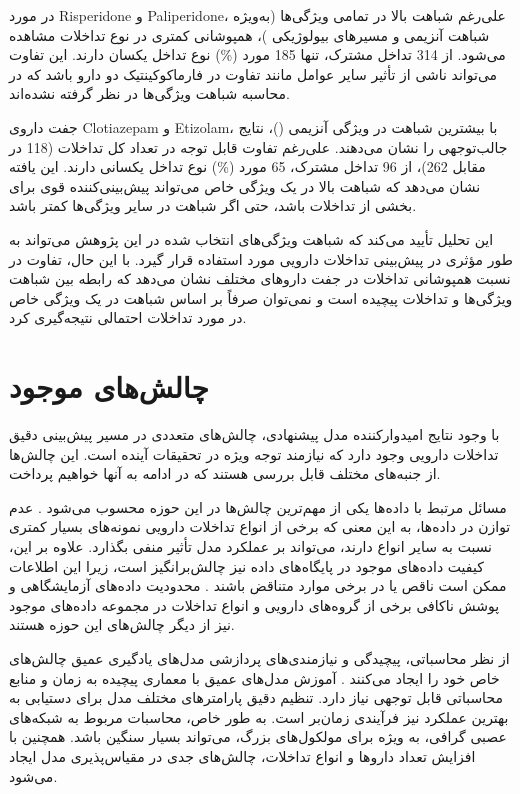 در مورد Risperidone و Paliperidone، علی‌رغم شباهت بالا در تمامی ویژگی‌ها (به‌ویژه شباهت آنزیمی  و مسیرهای بیولوژیکی )، همپوشانی کمتری در نوع تداخلات مشاهده می‌شود. از 314 تداخل مشترک، تنها 185 مورد (\%) نوع تداخل یکسان دارند. این تفاوت می‌تواند ناشی از تأثیر سایر عوامل مانند تفاوت در فارماکوکینتیک دو دارو باشد که در محاسبه شباهت ویژگی‌ها در نظر گرفته نشده‌اند.

جفت داروی Clotiazepam و Etizolam، با بیشترین شباهت در ویژگی آنزیمی ()، نتایج جالب‌توجهی را نشان می‌دهند. علی‌رغم تفاوت قابل توجه در تعداد کل تداخلات (118 در مقابل 262)، از 96 تداخل مشترک، 65 مورد (\%) نوع تداخل یکسانی دارند. این یافته نشان می‌دهد که شباهت بالا در یک ویژگی خاص می‌تواند پیش‌بینی‌کننده قوی برای بخشی از تداخلات باشد، حتی اگر شباهت در سایر ویژگی‌ها کمتر باشد.

این تحلیل تأیید می‌کند که شباهت ویژگی‌های انتخاب شده در این پژوهش می‌تواند به طور مؤثری در پیش‌بینی تداخلات دارویی مورد استفاده قرار گیرد. با این حال، تفاوت در نسبت همپوشانی تداخلات در جفت داروهای مختلف نشان می‌دهد که رابطه بین شباهت ویژگی‌ها و تداخلات پیچیده است و نمی‌توان صرفاً بر اساس شباهت در یک ویژگی خاص در مورد تداخلات احتمالی نتیجه‌گیری کرد.

\section{چالش‌های موجود}

با وجود نتایج امیدوارکننده مدل پیشنهادی، چالش‌های متعددی در مسیر پیش‌بینی دقیق تداخلات دارویی وجود دارد که نیازمند توجه ویژه در تحقیقات آینده است. این چالش‌ها از جنبه‌های مختلف قابل بررسی هستند که در ادامه به آنها خواهیم پرداخت.

مسائل مرتبط با داده‌ها یکی از مهم‌ترین چالش‌ها در این حوزه محسوب می‌شود \cite{ref_wang2017}. عدم توازن در داده‌ها، به این معنی که برخی از انواع تداخلات دارویی نمونه‌های بسیار کمتری نسبت به سایر انواع دارند، می‌تواند بر عملکرد مدل تأثیر منفی بگذارد. علاوه بر این، کیفیت داده‌های موجود در پایگاه‌های داده نیز چالش‌برانگیز است، زیرا این اطلاعات ممکن است ناقص یا در برخی موارد متناقض باشند \cite{ref_deng2020}. محدودیت داده‌های آزمایشگاهی و پوشش ناکافی برخی از گروه‌های دارویی و انواع تداخلات در مجموعه داده‌های موجود نیز از دیگر چالش‌های این حوزه هستند.

از نظر محاسباتی، پیچیدگی و نیازمندی‌های پردازشی مدل‌های یادگیری عمیق چالش‌های خاص خود را ایجاد می‌کنند \cite{ref_he2023}. آموزش مدل‌های عمیق با معماری پیچیده به زمان و منابع محاسباتی قابل توجهی نیاز دارد. تنظیم دقیق پارامترهای مختلف مدل برای دستیابی به بهترین عملکرد نیز فرآیندی زمان‌بر است. به طور خاص، محاسبات مربوط به شبکه‌های عصبی گرافی، به ویژه برای مولکول‌های بزرگ، می‌تواند بسیار سنگین باشد. همچنین با افزایش تعداد داروها و انواع تداخلات، چالش‌های جدی در مقیاس‌پذیری مدل ایجاد می‌شود.

